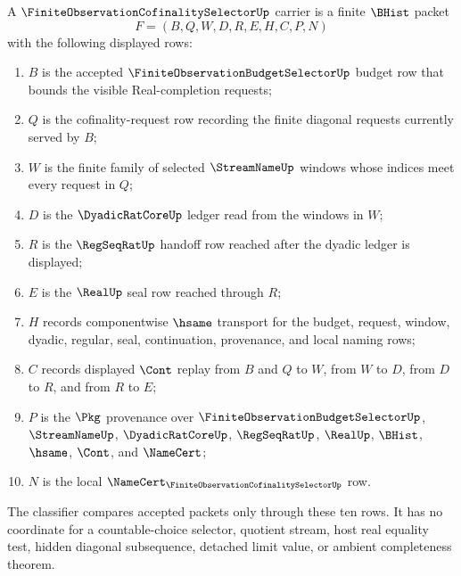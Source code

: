 \begin{definition}
\label{def:finite-observation-cofinality-selector-carrier}
A $\FiniteObservationCofinalitySelectorUp$ carrier is a finite $\BHist$ packet
$$
F=(B,Q,W,D,R,E,H,C,P,N)
$$
with the following displayed rows:
\begin{enumerate}
\item $B$ is the accepted $\FiniteObservationBudgetSelectorUp$ budget row that bounds the visible Real-completion requests;
\item $Q$ is the cofinality-request row recording the finite diagonal requests currently served by $B$;
\item $W$ is the finite family of selected $\StreamNameUp$ windows whose indices meet every request in $Q$;
\item $D$ is the $\DyadicRatCoreUp$ ledger read from the windows in $W$;
\item $R$ is the $\RegSeqRatUp$ handoff row reached after the dyadic ledger is displayed;
\item $E$ is the $\RealUp$ seal row reached through $R$;
\item $H$ records componentwise $\hsame$ transport for the budget, request, window, dyadic, regular, seal, continuation, provenance, and local naming rows;
\item $C$ records displayed $\Cont$ replay from $B$ and $Q$ to $W$, from $W$ to $D$, from $D$ to $R$, and from $R$ to $E$;
\item $P$ is the $\Pkg$ provenance over $\FiniteObservationBudgetSelectorUp$, $\StreamNameUp$, $\DyadicRatCoreUp$, $\RegSeqRatUp$, $\RealUp$, $\BHist$, $\hsame$, $\Cont$, and $\NameCert$;
\item $N$ is the local $\NameCert_{\FiniteObservationCofinalitySelectorUp}$ row.
\end{enumerate}
The classifier compares accepted packets only through these ten rows. It has no coordinate for a countable-choice selector, quotient stream, host real equality test, hidden diagonal subsequence, detached limit value, or ambient completeness theorem.
\end{definition}

